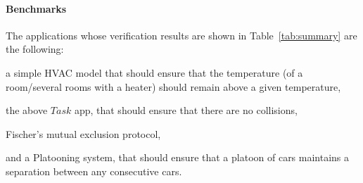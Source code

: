 \paragraph*{Benchmarks}
The applications whose verification results are shown in Table~\ref{tab:summary} are the following:

\begin{inparaenum}[(i)]
\item a simple HVAC model that should ensure that the temperature (of a room/several rooms with a heater) should remain above a  given temperature, 
\item  the above $\mathit{Task}$ app, that should ensure that there are no collisions, 
\item Fischer's mutual exclusion protocol, 
\item and a Platooning system, that should ensure that a platoon of cars maintains a separation between any consecutive cars. 
\end{inparaenum}

